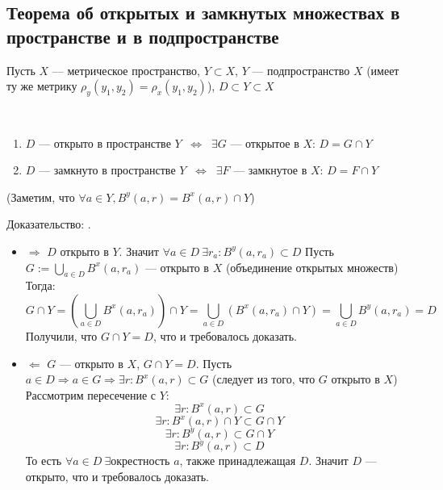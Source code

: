  \subsection{Теорема об открытых и замкнутых множествах в пространстве и в подпространстве}
    Пусть $X$ --- метрическое пространство, $Y \subset X$, $Y$ --- подпространство $X$ (имеет ту же метрику $\rho_y(y_1, y_2) = \rho_x(y_1, y_2)$), $D \subset Y \subset X$
    \newline
    \begin{theorem*}\ \\
    \begin{enumerate}
        \item $D$ --- открыто в пространстве $Y$ $\ \Leftrightarrow \ $ $\exists G$ --- открытое в $X$: $D = G \cap Y$
        \item $D$ --- замкнуто в пространстве $Y$ $\ \Leftrightarrow \ $ $\exists F$ --- замкнутое в $X$: $D = F \cap Y$
    \end{enumerate}
    (Заметим, что $\forall a \in Y, B^y(a, r) = B^x(a, r) \cap Y$)
    \end{theorem*}
    Доказательство:
    . \begin{itemize}
        \item $\Rightarrow$
        \newline
        \newline
        $D$ открыто в $Y$. Значит $\forall a \in D \ \exists r_a : B^y(a, r_a) \subset D$
        \newline
        Пусть $G := \bigcup\limits_{a \in D} B^x(a, r_a)$ --- открыто в $X$ (объединение открытых множеств)
        \newline
        Тогда:
        \newline
        $$G \cap Y = (\bigcup\limits_{a \in D} B^x(a, r_a)) \cap Y = \bigcup\limits_{a \in D} (B^x(a, r_a) \cap Y) = \bigcup\limits_{a \in D} B^y(a, r_a) = D$$
        \newline
        Получили, что $G \cap Y = D$, что и требовалось доказать.
        \item $\Leftarrow$
        \newline
        \newline
        $G$ --- открыто в $X$, $G \cap Y = D$.
        \newline
        Пусть $a \in D \Rightarrow a \in G \Rightarrow \exists r : B^x(a, r) \subset G$ (следует из того, что $G$ открыто в $X$)
        \newline
        Рассмотрим пересечение с $Y$:
        \newline
        $$\exists r : B^x(a, r) \subset G$$
        $$\exists r : B^x(a, r) \cap Y \subset G \cap Y$$
        $$\exists r : B^y(a, r) \subset G \cap Y$$
        $$\exists r : B^y(a, r) \subset D$$
        То есть $\forall a \in D \ \exists$окрестность $a$, также принадлежащая $D$. Значит $D$ --- открыто, что и требовалось доказать.
    \end{itemize}
